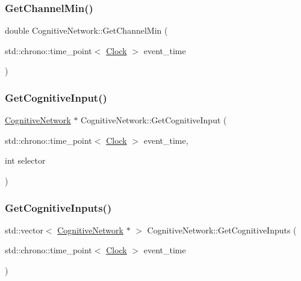 \mbox{\label{classCognitiveNetwork_ad7f5cc836340017d38c22b57e177fc91}} 
\subsubsection{\texorpdfstring{Get\+Channel\+Min()}{GetChannelMin()}}
{\footnotesize\ttfamily double Cognitive\+Network\+::\+Get\+Channel\+Min (\begin{DoxyParamCaption}\item[{std\+::chrono\+::time\+\_\+point$<$ \mbox{\hyperlink{universe_8h_a0ef8d951d1ca5ab3cfaf7ab4c7a6fd80}{Clock}} $>$}]{event\+\_\+time }\end{DoxyParamCaption})\hspace{0.3cm}{\ttfamily [inline]}}

\mbox{\label{classCognitiveNetwork_a2ff68a0d11cdb29af2f05a69a11911a4}} 
\subsubsection{\texorpdfstring{Get\+Cognitive\+Input()}{GetCognitiveInput()}}
{\footnotesize\ttfamily \mbox{\hyperlink{classCognitiveNetwork}{Cognitive\+Network}} $\ast$ Cognitive\+Network\+::\+Get\+Cognitive\+Input (\begin{DoxyParamCaption}\item[{std\+::chrono\+::time\+\_\+point$<$ \mbox{\hyperlink{universe_8h_a0ef8d951d1ca5ab3cfaf7ab4c7a6fd80}{Clock}} $>$}]{event\+\_\+time,  }\item[{int}]{selector }\end{DoxyParamCaption})}

\mbox{\label{classCognitiveNetwork_a92b896643b881e4030401e0f7fd256bf}} 
\subsubsection{\texorpdfstring{Get\+Cognitive\+Inputs()}{GetCognitiveInputs()}}
{\footnotesize\ttfamily std\+::vector$<$ \mbox{\hyperlink{classCognitiveNetwork}{Cognitive\+Network}} $\ast$ $>$ Cognitive\+Network\+::\+Get\+Cognitive\+Inputs (\begin{DoxyParamCaption}\item[{std\+::chrono\+::time\+\_\+point$<$ \mbox{\hyperlink{universe_8h_a0ef8d951d1ca5ab3cfaf7ab4c7a6fd80}{Clock}} $>$}]{event\+\_\+time }\end{DoxyParamCaption})}

